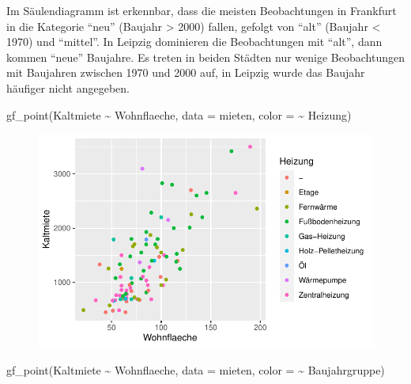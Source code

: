\documentclass[
  a4paper,
  DIV=11]{scrartcl}
\newenvironment{Shaded}{\begin{snugshade}}{\end{snugshade}}
\newcommand{\AttributeTok}[1]{\textcolor[rgb]{0.40,0.45,0.13}{#1}}
\newcommand{\FunctionTok}[1]{\textcolor[rgb]{0.28,0.35,0.67}{#1}}
\newcommand{\NormalTok}[1]{\textcolor[rgb]{0.00,0.23,0.31}{#1}}
\newcommand{\SpecialCharTok}[1]{\textcolor[rgb]{0.37,0.37,0.37}{#1}}
\begin{document}
Im Säulendiagramm ist erkennbar, dass die meisten Beobachtungen in
Frankfurt in die Kategorie ``neu'' (Baujahr \textgreater{} 2000) fallen,
gefolgt von ``alt'' (Baujahr \textless{} 1970) und ``mittel''. In
Leipzig dominieren die Beobachtungen mit ``alt'', dann kommen ``neue''
Baujahre. Es treten in beiden Städten nur wenige Beobachtungen mit
Baujahren zwischen 1970 und 2000 auf, in Leipzig wurde das Baujahr
häufiger nicht angegeben.

\begin{Shaded}
\begin{Highlighting}[]
\FunctionTok{gf\_point}\NormalTok{(Kaltmiete }\SpecialCharTok{\textasciitilde{}}\NormalTok{ Wohnflaeche, }\AttributeTok{data =}\NormalTok{ mieten, }\AttributeTok{color =} \SpecialCharTok{\textasciitilde{}}\NormalTok{ Heizung)}
\end{Highlighting}
\end{Shaded}

\begin{figure}[H]

{\centering \includegraphics{Mietmodellierung_files/figure-pdf/unnamed-chunk-11-1.pdf}

}

\end{figure}

\begin{Shaded}
\begin{Highlighting}[]
\FunctionTok{gf\_point}\NormalTok{(Kaltmiete }\SpecialCharTok{\textasciitilde{}}\NormalTok{ Wohnflaeche, }\AttributeTok{data =}\NormalTok{ mieten, }\AttributeTok{color =} \SpecialCharTok{\textasciitilde{}}\NormalTok{ Baujahrgruppe)}
\end{Highlighting}
\end{Shaded}
\end{document}
